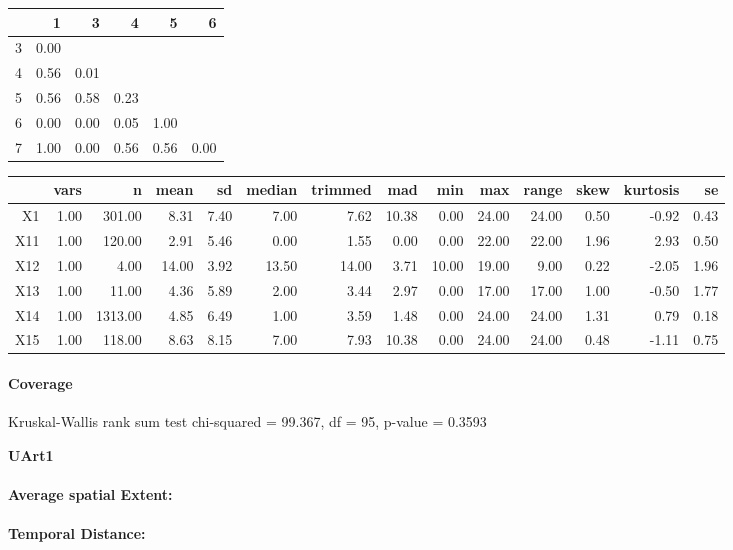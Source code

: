 \begin{table}[ht]
\begin{tabular}{rrrrrr}
  \hline
 & 1 & 3 & 4 & 5 & 6 \\ 
  \hline
3 & 0.00 &  &  &  &  \\ 
  4 & 0.56 & 0.01 &  &  &  \\ 
  5 & 0.56 & 0.58 & 0.23 &  &  \\ 
  6 & 0.00 & 0.00 & 0.05 & 1.00 &  \\ 
  7 & 1.00 & 0.00 & 0.56 & 0.56 & 0.00 \\ 
   \hline
\end{tabular}

\begin{tabular}{rrrrrrrrrrrrrr}
  \hline
 & vars & n & mean & sd & median & trimmed & mad & min & max & range & skew & kurtosis & se \\ 
  \hline
X1 & 1.00 & 301.00 & 8.31 & 7.40 & 7.00 & 7.62 & 10.38 & 0.00 & 24.00 & 24.00 & 0.50 & -0.92 & 0.43 \\ 
  X11 & 1.00 & 120.00 & 2.91 & 5.46 & 0.00 & 1.55 & 0.00 & 0.00 & 22.00 & 22.00 & 1.96 & 2.93 & 0.50 \\ 
  X12 & 1.00 & 4.00 & 14.00 & 3.92 & 13.50 & 14.00 & 3.71 & 10.00 & 19.00 & 9.00 & 0.22 & -2.05 & 1.96 \\ 
  X13 & 1.00 & 11.00 & 4.36 & 5.89 & 2.00 & 3.44 & 2.97 & 0.00 & 17.00 & 17.00 & 1.00 & -0.50 & 1.77 \\ 
  X14 & 1.00 & 1313.00 & 4.85 & 6.49 & 1.00 & 3.59 & 1.48 & 0.00 & 24.00 & 24.00 & 1.31 & 0.79 & 0.18 \\ 
  X15 & 1.00 & 118.00 & 8.63 & 8.15 & 7.00 & 7.93 & 10.38 & 0.00 & 24.00 & 24.00 & 0.48 & -1.11 & 0.75 \\ 
   \hline
\end{tabular}

\paragraph{Coverage}
Kruskal-Wallis rank sum test chi-squared = 99.367, df = 95, p-value = 0.3593

\large
\centerline{\textbf{UArt1}}
\normalsize

\paragraph{Average spatial Extent:}
\paragraph{Temporal Distance:}

\end{table}
